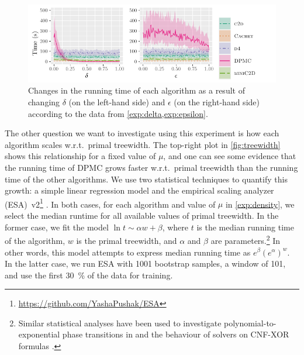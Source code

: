 \begin{figure}[t]
  \centering
  \includegraphics{chapters/comparison/delta_epsilon}
  \caption{Changes in the running time of each algorithm as a result of changing
    $\delta$ (on the left-hand side) and $\epsilon$ (on the right-hand side)
    according to the data from
    \cref{exp:delta,exp:epsilon}.}\label{fig:delta_epsilon}
\end{figure}

The other question we want to investigate using this experiment is how each algorithm scales w.r.t.\ primal treewidth. The top-right plot in \cref{fig:treewidth} shows this relationship for a fixed value of $\mu$, and one can see some evidence that the running time of \textsc{DPMC} grows faster w.r.t.\ primal treewidth than the running time of the other algorithms. We use two statistical techniques to quantify this growth: a simple linear regression model and the empirical scaling analyzer (ESA)~v2\footnote{\url{https://github.com/YashaPushak/ESA}} \citep{DBLP:conf/gecco/PushakH20}. In both cases, for each algorithm and value of $\mu$ in \cref{exp:density}, we select the median runtime for all available values of primal treewidth. In the former case, we fit the model $\ln t \sim \alpha w + \beta$, where $t$ is the median running time of the algorithm, $w$ is the primal treewidth, and $\alpha$ and $\beta$ are parameters.\footnote{Similar statistical analyses have been used to investigate polynomial-to-exponential phase transitions in \SAT{} \citep{DBLP:journals/constraints/CoarfaDASV03} and the behaviour of \SAT{} solvers on CNF-XOR formulas \citep{DBLP:conf/ijcai/DudekMV17}.} In other words, this model attempts to express median running time as $e^\beta{(e^\alpha)}^w$. In the latter case, we run ESA with 1001 bootstrap samples, a window of 101, and use the first \SI{30}{\percent} of the data for training.

